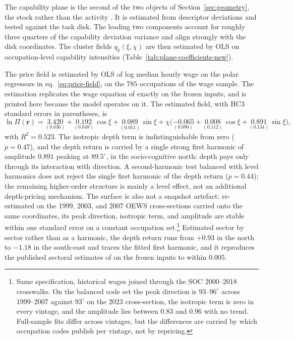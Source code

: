 \documentclass[12pt, a4paper]{article}
\begin{document}
The capability plane is the second of the two objects of
Section~\ref{sec:geometry}, the stock rather than the activity
\parencite{autor2013a}. It is estimated from descriptor deviations and
tested against the task disk. The leading two components account for roughly
three quarters of the capability deviation variance and align strongly
with the disk coordinates. The cluster fields $q_k(\xi,\chi)$ are then
estimated by OLS on occupation-level capability intensities
(Table~\ref{tab:plane-coefficients-new}).

The price field is estimated by OLS of log median hourly wage on the
polar regressors in eq.~\eqref{eq:price-field}, on the $785$
occupations of the wage sample. The estimation replicates the wage
equation of \textcite{storck2026geometry} exactly on the frozen
inputs, and is printed here because the model operates on it. The
estimated field, with HC3 standard
errors in parentheses, is
\begin{equation}
\ln \Pi(\mathbf{r}) =
\underset{(0.036)}{3.420}
+ \underset{(0.048)}{0.192}\,\cos\xi
+ \underset{(0.051)}{0.089}\,\sin\xi
+ \chi\bigl(\underset{(0.090)}{-0.065}
+ \underset{(0.112)}{0.008}\,\cos\xi
+ \underset{(0.134)}{0.891}\,\sin\xi\bigr),
\label{eq:price-estimates}
\end{equation}
with $R^2 = 0.523$. The isotropic depth term is indistinguishable from
zero ($p = 0.47$), and the depth return is carried by a single strong
first harmonic of amplitude $0.891$ peaking at $89.5^\circ$, in the
socio-cognitive north: depth pays only through its interaction with
direction. A second-harmonic test balanced with level harmonics does
not reject the single first harmonic of the depth return ($p = 0.44$);
the remaining higher-order structure is mainly a level effect, not an
additional depth-pricing mechanism. The surface is also not a snapshot
artefact: re-estimated on the 1999, 2003, and 2007 OEWS cross-sections
carried onto the same coordinates, its peak direction, isotropic term,
and amplitude are stable within one standard error on a constant
occupation set.\footnote{Same specification, historical wages joined
through the SOC 2000--2018 crosswalks. On the balanced code set the
peak direction is $93$--$96^\circ$ across 1999--2007 against $93^\circ$
on the 2023 cross-section, the isotropic term is zero in every vintage,
and the amplitude lies between $0.83$ and $0.96$ with no trend.
Full-sample fits differ across vintages, but the differences are
carried by which occupation codes publish per vintage, not by
repricing.} Estimated sector by sector rather than as a harmonic, the
depth return runs from $+0.93$ in the north to $-1.18$ in the
south-east and traces the fitted first harmonic, and it reproduces the
published sectoral estimates of \textcite{storck2026geometry} on the
frozen inputs to within $0.005$.
\end{document}
